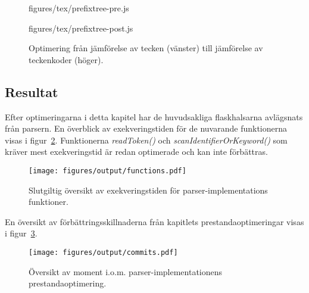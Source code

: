 \begin{figure}[ht]
  \begin{minipage}[t]{0.5\textwidth}
      {figures/tex/prefixtree-pre.js}
  \end{minipage}%
  \begin{minipage}[t]{0.5\textwidth}
      {figures/tex/prefixtree-post.js}
  \end{minipage}
  \caption{Optimering från jämförelse av tecken (vänster) till jämförelse av teckenkoder (höger).}
  \label{fig:switchtree}
\end{figure}

\subsection{Resultat}

Efter optimeringarna i detta kapitel har de huvudsakliga flaskhalsarna
avlägsnats från parsern. En överblick av exekveringstiden för de nuvarande
funktionerna visas i figur~\ref{fig:funcdist}. Funktionerna
\textit{readToken()} och \textit{scanIdentifierOrKeyword()} som kräver mest
exekveringstid är redan optimerade och kan inte förbättras.

\begin{figure}[ht]
  \texttt{[image: figures/output/functions.pdf]}
  \caption{Slutgiltig översikt av exekveringstiden för parser-implementations
    funktioner.}
  \label{fig:funcdist}
\end{figure}

En översikt av förbättringsskillnaderna från kapitlets prestandaoptimeringar
visas i figur~\ref{fig:perf-overview}.

\begin{figure}[ht]
  \texttt{[image: figures/output/commits.pdf]}
  \caption{Översikt av moment i.o.m. parser-implementationens
    prestandaoptimering.}
  \label{fig:perf-overview}
\end{figure}

